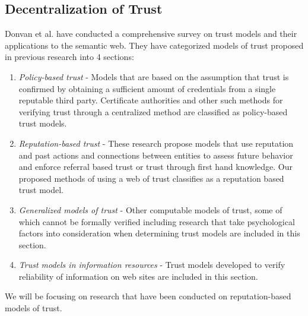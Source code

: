 \subsection{Decentralization of Trust}
Donvan et al. have conducted a comprehensive survey on trust models and their applications to the semantic web\cite{artz2007survey}. They have categorized models of trust proposed in previous research into 4 sections:
\begin{enumerate}
\item \textit{Policy-based trust} - Models that are based on the assumption that trust is confirmed by obtaining a sufficient amount of credentials from a single reputable third party. Certificate authorities and other such methods for verifying trust through a centralized method are classified as policy-based trust models.
\item \textit{Reputation-based trust} - These research propose models that use reputation and past actions and connections between entities to assess future behavior and enforce referral based trust or trust through first hand knowledge. Our proposed methods of  using a web of trust classifies as a reputation based trust model.
\item \textit{Generalized models of trust} - Other computable models of trust, some of which cannot be formally verified including research that take psychological factors into consideration when determining trust models are included in this section.
\item \textit{Trust models in information resources} - Trust models developed to verify reliability of information on web sites are included in this section. 
\end{enumerate}
We will be focusing on research that have been conducted on reputation-based models of trust. 


